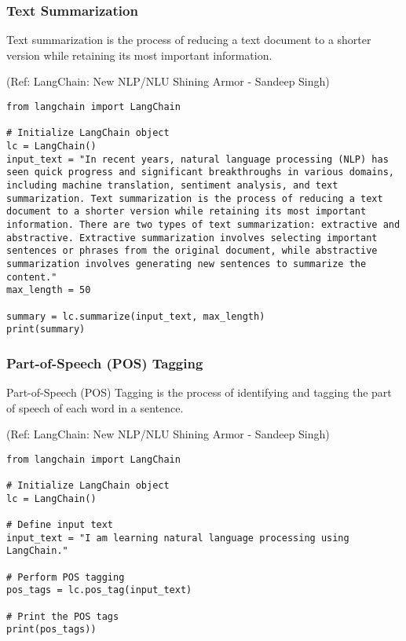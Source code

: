 \begin{frame}[fragile]\frametitle{Text Summarization}

Text summarization is the process of reducing a text document to a shorter version while retaining its most important information.

{\tiny (Ref: LangChain: New NLP/NLU Shining Armor - Sandeep Singh)}

\begin{lstlisting}
from langchain import LangChain

# Initialize LangChain object
lc = LangChain()
input_text = "In recent years, natural language processing (NLP) has seen quick progress and significant breakthroughs in various domains, including machine translation, sentiment analysis, and text summarization. Text summarization is the process of reducing a text document to a shorter version while retaining its most important information. There are two types of text summarization: extractive and abstractive. Extractive summarization involves selecting important sentences or phrases from the original document, while abstractive summarization involves generating new sentences to summarize the content."
max_length = 50

summary = lc.summarize(input_text, max_length)
print(summary)
\end{lstlisting}	  

\end{frame}

\begin{frame}[fragile]\frametitle{Part-of-Speech (POS) Tagging}

Part-of-Speech (POS) Tagging is the process of identifying and tagging the part of speech of each word in a sentence. 

{\tiny (Ref: LangChain: New NLP/NLU Shining Armor - Sandeep Singh)}

\begin{lstlisting}
from langchain import LangChain

# Initialize LangChain object
lc = LangChain()

# Define input text
input_text = "I am learning natural language processing using LangChain."

# Perform POS tagging
pos_tags = lc.pos_tag(input_text)

# Print the POS tags
print(pos_tags))
\end{lstlisting}	  

\end{frame}

